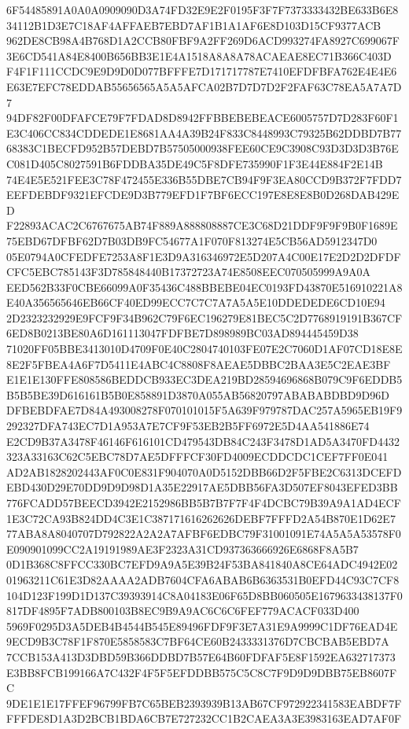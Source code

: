 \documentclass[UTF8,fontset=fandol,zihao=-4,a4paper]{ctexart}
\begin{document}
{{6F54485891A0A0A0909090D3A74FD32E9E2F0195F3F7F7373333432BE633B6E834112B1D3E7C18AF4AFFAEB7EBD7AF1B1A1AF6E8D103D15CF9377ACB
962DE8CB98A4B768D1A2CCB80FBF9A2FF269D6ACD993274FA8927C699067F3E6CD541A84E8400B656BB3E1E4A1518A8A8A78ACAEAE8EC71B366C403D
F4F1F111CCDC9E9D9D0D077BFFFE7D171717787E7410EFDFBFA762E4E4E6E63E7EFC78EDDAB55656565A5A5AFCA02B7D7D7D2F2FAF63C78EA5A7A7D7
94DF82F00DFAFCE79F7FDAD8D8942FFBBEBEBEACE6005757D7D283F60F1E3C406CC834CDDEDE1E8681AA4A39B24F833C8448993C79325B62DDBD7B77
68383C1BECFD952B57DEBD7B57505000938FEE60CE9C3908C93D3D3D3B76EC081D405C8027591B6FDDBA35DE49C5F8DFE735990F1F3E44E884F2E14B
74E4E5E521FEE3C78F472455E336B55DBE7CB94F9F3EA80CCD9B372F7FDD7EEFDEBDF9321EFCDE9D3B779EFD1F7BF6ECC197E8E8E8B0D268DAB429ED
F22893ACAC2C6767675AB74F889A888808887CE3C68D21DDF9F9F9B0F1689E75EBD67DFBF62D7B03DB9FC54677A1F070F813274E5CB56AD5912347D0
05E0794A0CFEDFE7253A8F1E3D9A316346972E5D207A4C00E17E2D2D2DFDFCFC5EBC785143F3D785848440B17372723A74E8508EEC070505999A9A0A
EED562B33F0CBE66099A0F35436C488BBEBE04EC0193FD43870E516910221A8E40A356565646EB66CF40ED99ECC7C7C7A7A5A5E10DDEDEDE6CD10E94
2D2323232929E9FCF9F34B962C79F6EC196279E81BEC5C2D7768919191B367CF6ED8B0213BE80A6D161113047FDFBE7D898989BC03AD894445459D38
71020FF05BBE3413010D4709F0E40C2804740103FE07E2C7060D1AF07CD18E8E8E2F5FBEA4A6F7D5411E4ABC4C8808F8AEAE5DBBC2BAA3E5C2EAE3BF
E1E1E130FFE808586BEDDCB933EC3DEA219BD28594696868B079C9F6EDDB5B5B5BE39D616161B5B0E858891D3870A055AB56820797ABABABDBD9D96D
DFBEBDFAE7D84A493008278F070101015F5A639F979787DAC257A5965EB19F9292327DFA743EC7D1A953A7E7CF9F53EB2B5FF6972E5D4AA541886E74
E2CD9B37A3478F46146F616101CD479543DB84C243F3478D1AD5A3470FD4432323A33163C62C5EBC78D7AE5DFFFCF30FD4009ECDDCDC1CEF7FF0E041
AD2AB1828202443AF0C0E831F904070A0D5152DBB66D2F5FBE2C6313DCEFDEBD430D29E70DD9D9D98D1A35E22917AE5DBB56FA3D507EF8043EFED3BB
776FCADD57BEECD3942E2152986BB5B7B7F7F4F4DCBC79B39A9A1AD4ECF1E3C72CA93B824DD4C3E1C387171616262626DEBF7FFFD2A54B870E1D62E7
77ABA8A8040707D792822A2A2A7AFBF6EDBC79F31001091E74A5A5A53578F0E090901099CC2A19191989AE3F2323A31CD937363666926E6868F8A5B7
0D1B368C8FFCC330BC7EFD9A9A5E39B24F53BA841840A8CE64ADC4942E0201963211C61E3D82AAAA2ADB7604CFA6ABAB6B6363531B0EFD44C93C7CF8
104D123F199D1D137C39393914C8A04183E06F65D8BB060505E1679633438137F0817DF4895F7ADB800103B8EC9B9A9AC6C6C6FEF779ACACF033D400
5969F0295D3A5DEB4B4544B545E89496FDF9F3E7A31E9A9999C1DF76EAD4E9ECD9B3C78F1F870E5858583C7BF64CE60B2433331376D7CBCBAB5EBD7A
7CCB153A413D3DBD59B366DDBD7B57E64B60FDFAF5E8F1592EA632717373E3BB8FCB199166A7C432F4F5F5EFDDBB575C5C8C7F9D9D9DBB75EB8607FC
9DE1E1E17FFEF96799FB7C65BEB2393939B13AB67CF972922341583EABDF7FFFFDE8D1A3D2BCB1BDA6CB7E727232CC1B2CAEA3A3E3983163EAD7AF0F
}}
\end{document}
